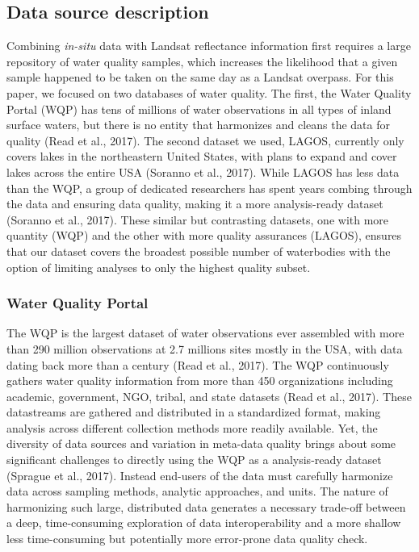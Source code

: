 \documentclass[]{article}
\begin{document}
\hypertarget{data-source-description}{%
\subsection{Data source description}\label{data-source-description}}

Combining \emph{in-situ} data with Landsat reflectance information first
requires a large repository of water quality samples, which increases
the likelihood that a given sample happened to be taken on the same day
as a Landsat overpass. For this paper, we focused on two databases of
water quality. The first, the Water Quality Portal (WQP) has tens of
millions of water observations in all types of inland surface waters,
but there is no entity that harmonizes and cleans the data for quality
(Read et al., 2017). The second dataset we used, LAGOS, currently only
covers lakes in the northeastern United States, with plans to expand and
cover lakes across the entire USA (Soranno et al., 2017). While LAGOS
has less data than the WQP, a group of dedicated researchers has spent
years combing through the data and ensuring data quality, making it a
more analysis-ready dataset (Soranno et al., 2017). These similar but
contrasting datasets, one with more quantity (WQP) and the other with
more quality assurances (LAGOS), ensures that our dataset covers the
broadest possible number of waterbodies with the option of limiting
analyses to only the highest quality subset.

\hypertarget{water-quality-portal}{%
\subsubsection{Water Quality Portal}\label{water-quality-portal}}

The WQP is the largest dataset of water observations ever assembled with
more than 290 million observations at 2.7 millions sites mostly in the
USA, with data dating back more than a century (Read et al., 2017). The
WQP continuously gathers water quality information from more than 450
organizations including academic, government, NGO, tribal, and state
datasets (Read et al., 2017). These datastreams are gathered and
distributed in a standardized format, making analysis across different
collection methods more readily available. Yet, the diversity of data
sources and variation in meta-data quality brings about some significant
challenges to directly using the WQP as a analysis-ready dataset
(Sprague et al., 2017). Instead end-users of the data must carefully
harmonize data across sampling methods, analytic approaches, and units.
The nature of harmonizing such large, distributed data generates a
necessary trade-off between a deep, time-consuming exploration of data
interoperability and a more shallow less time-consuming but potentially
more error-prone data quality check.
\end{document}
